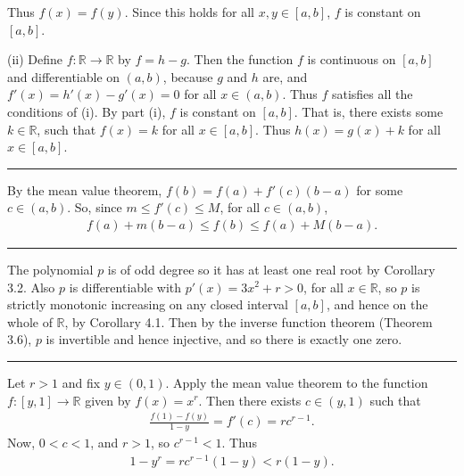 \documentclass[letterpaper,10pt,english]{jupyterBook}
\begin{document}
\sphinxAtStartPar
Thus \(f(x)=f(y)\). Since this holds for all \(x,y\in [a,b]\), \(f\) is constant on \([a,b]\).

\sphinxAtStartPar
(ii) Define \(f:\mathbb{R}\to\mathbb{R}\) by \(f = h-g\). Then the function \(f\) is continuous on \([a,b]\) and differentiable on \((a,b)\), because \(g\) and \(h\) are, and \(f'(x)=h'(x)-g'(x)=0\) for all \(x\in (a,b)\). Thus \(f\) satisfies all the conditions of (i). By part (i), \(f\) is constant on \([a,b]\). That is, there exists some \(k\in \mathbb{R}\), such that \(f(x)=k\) for all \(x\in [a,b]\). Thus \(h(x)=g(x)+k\) for all \(x\in [a,b]\).


\bigskip\hrule\bigskip


\sphinxAtStartPar
{\hyperref[\detokenize{Problems:id50}]{}} By the mean value theorem, \(f(b) = f(a) + f'(c)(b - a)\) for some \(c\in (a,b)\). So, since \(m \leq f'(c) \leq M\), for all \(c \in (a, b)\),
\begin{equation*}
\begin{split}
f(a) + m(b - a) \leq f(b) \leq f(a) + M(b - a).
\end{split}
\end{equation*}

\bigskip\hrule\bigskip


\sphinxAtStartPar
{\hyperref[\detokenize{Problems:id51}]{}} The polynomial \(p\) is of odd degree so it has at least one real root by Corollary 3.2. Also \(p\) is differentiable with \(p'(x) = 3x^{2} + r > 0\), for all \(x \in \mathbb{R}\), so \(p\) is strictly monotonic increasing on any closed interval \([a, b]\), and hence on the whole of \(\mathbb{R}\), by Corollary 4.1. Then by the inverse function theorem (Theorem 3.6), \(p\) is invertible and hence injective, and so there is exactly one zero.


\bigskip\hrule\bigskip


\sphinxAtStartPar
{\hyperref[\detokenize{Problems:id52}]{}} Let \(r>1\) and fix \(y\in (0,1)\). Apply the mean value theorem to the function \(f:[y,1]\to\mathbb{R}\) given by \(f(x) = x^r\). Then there exists \(c \in (y, 1)\) such that
\begin{equation*}
\begin{split}
\frac{f(1)-f(y)}{1-y}=f'(c)=rc^{r-1}.
\end{split}
\end{equation*}
\sphinxAtStartPar
Now, \(0<c<1\), and \(r>1\), so \(c^{r-1}<1\). Thus
\begin{equation*}
\begin{split}
1 - y^r = rc^{r-1}( 1- y) < r(1 - y).
\end{split}
\end{equation*}
\end{document}
